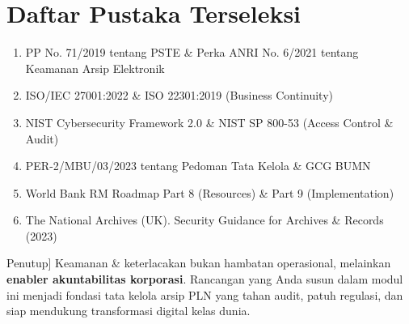 \documentclass[12pt,a4paper]{report}
\begin{document}
\section*{Daftar Pustaka Terseleksi}
\begin{enumerate}[leftmargin=*, nosep]
    \item PP No. 71/2019 tentang PSTE \& Perka ANRI No. 6/2021 tentang Keamanan Arsip Elektronik
    \item ISO/IEC 27001:2022 \& ISO 22301:2019 (Business Continuity)
    \item NIST Cybersecurity Framework 2.0 \& NIST SP 800-53 (Access Control \& Audit)
    \item PER-2/MBU/03/2023 tentang Pedoman Tata Kelola \& GCG BUMN
    \item World Bank RM Roadmap Part 8 (Resources) \& Part 9 (Implementation)
    \item The National Archives (UK). Security Guidance for Archives \& Records (2023)
\end{enumerate}

\vspace{1cm}
\begin{plnbox}[NOTE] Penutup]
Keamanan \& keterlacakan bukan hambatan operasional, melainkan \textbf{enabler akuntabilitas korporasi}. Rancangan yang Anda susun dalam modul ini menjadi fondasi tata kelola arsip PLN yang tahan audit, patuh regulasi, dan siap mendukung transformasi digital kelas dunia.
\end{plnbox}
\end{document}
